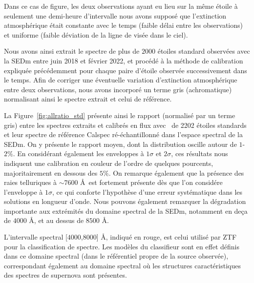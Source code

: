 \documentclass[../main/main.tex]{subfiles}
\begin{document}
Dans ce cas de figure, les deux observations ayant eu lieu sur la même
étoile à seulement une demi-heure d'intervalle nous avons supposé que
l'extinction atmosphérique était constante avec le temps (faible délai
entre les observations) et uniforme (faible déviation de la ligne de
visée dans le ciel).

Nous avons ainsi extrait le spectre de plus de $2000$ étoiles standard
observées avec la SEDm entre juin 2018 et février 2022, et procédé
à la méthode de calibration expliquée précédemment pour chaque paire d'étoile observée
successivement dans le temps.
Afin de corriger une éventuelle variation d'extinction atmosphérique
entre deux observations, nous avons incorporé un terme gris
(achromatique) normalisant ainsi le spectre extrait et celui de référence.

La Figure~\ref{fig:allratio_std} présente ainsi le rapport (normalisé par
un terme gris) entre les spectres extraits et calibrés en flux avec \hypergal\ de 2202 étoiles
standards et leur spectre de référence Calspec ré-échantillonné dans
l'espace spectral de la SEDm. On y présente le rapport moyen, dont la
distribution oscille autour de $1$-$2\%$. En considérant également les
enveloppes à $1\sigma$ et $2\sigma$, ces résultats nous indiquent une
calibration en couleur de l'ordre de quelques pourcents, majoritairement
en dessous des $5\%$. On remarque également que la présence des raies
telluriques à $\sim7600$ \AA\ est fortement présente dès que l'on
considére l'enveloppe à $1\sigma$, ce qui conforte l'hypothèse d'une
erreur systématique dans les solutions en longueur d'onde.
Nous pouvons également remarquer la dégradation importante aux
extrémités du domaine spectral de la SEDm, notamment en deça de
$4000$ \AA, et au dessus de $8500$ \AA.

L'intervalle spectral
[$4000$,$8000$] \AA, indiqué en rouge, est celui utilisé par ZTF pour
la classification de spectre. Les modèles du
classifieur  sont en effet définis dans ce
domaine spectral (dans le référentiel propre de la source observée),
correspondant
également au domaine spectral où les structures caractéristiques des
  spectres de supernova sont présentes.
\end{document}
